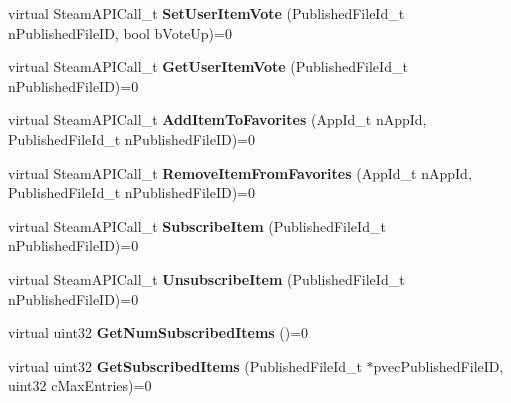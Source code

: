 \begin{DoxyCompactItemize}
\item 
\hypertarget{classISteamUGC_a3533f018be34c76fc0163b286b904ce0}{}virtual Steam\+A\+P\+I\+Call\+\_\+t {\bfseries Set\+User\+Item\+Vote} (Published\+File\+Id\+\_\+t n\+Published\+File\+I\+D, bool b\+Vote\+Up)=0\label{classISteamUGC_a3533f018be34c76fc0163b286b904ce0}

\item 
\hypertarget{classISteamUGC_a6621517b2fe7a1b95744209c6e39203f}{}virtual Steam\+A\+P\+I\+Call\+\_\+t {\bfseries Get\+User\+Item\+Vote} (Published\+File\+Id\+\_\+t n\+Published\+File\+I\+D)=0\label{classISteamUGC_a6621517b2fe7a1b95744209c6e39203f}

\item 
\hypertarget{classISteamUGC_aee72d92d194438dea2c5e83bd1927456}{}virtual Steam\+A\+P\+I\+Call\+\_\+t {\bfseries Add\+Item\+To\+Favorites} (App\+Id\+\_\+t n\+App\+Id, Published\+File\+Id\+\_\+t n\+Published\+File\+I\+D)=0\label{classISteamUGC_aee72d92d194438dea2c5e83bd1927456}

\item 
\hypertarget{classISteamUGC_a1f90c626d5d0802690b9c8433a4da0b5}{}virtual Steam\+A\+P\+I\+Call\+\_\+t {\bfseries Remove\+Item\+From\+Favorites} (App\+Id\+\_\+t n\+App\+Id, Published\+File\+Id\+\_\+t n\+Published\+File\+I\+D)=0\label{classISteamUGC_a1f90c626d5d0802690b9c8433a4da0b5}

\item 
\hypertarget{classISteamUGC_a6f02df346f7288bef0118a10d3800ce5}{}virtual Steam\+A\+P\+I\+Call\+\_\+t {\bfseries Subscribe\+Item} (Published\+File\+Id\+\_\+t n\+Published\+File\+I\+D)=0\label{classISteamUGC_a6f02df346f7288bef0118a10d3800ce5}

\item 
\hypertarget{classISteamUGC_a26fff1983afe3e772774708e601080ba}{}virtual Steam\+A\+P\+I\+Call\+\_\+t {\bfseries Unsubscribe\+Item} (Published\+File\+Id\+\_\+t n\+Published\+File\+I\+D)=0\label{classISteamUGC_a26fff1983afe3e772774708e601080ba}

\item 
\hypertarget{classISteamUGC_af95c6733e546b88cb9164e6407ebd502}{}virtual uint32 {\bfseries Get\+Num\+Subscribed\+Items} ()=0\label{classISteamUGC_af95c6733e546b88cb9164e6407ebd502}

\item 
\hypertarget{classISteamUGC_a1de3ae29c325cc376cc4eb636a22e3d9}{}virtual uint32 {\bfseries Get\+Subscribed\+Items} (Published\+File\+Id\+\_\+t $\ast$pvec\+Published\+File\+I\+D, uint32 c\+Max\+Entries)=0\label{classISteamUGC_a1de3ae29c325cc376cc4eb636a22e3d9}


\end{DoxyCompactItemize}
